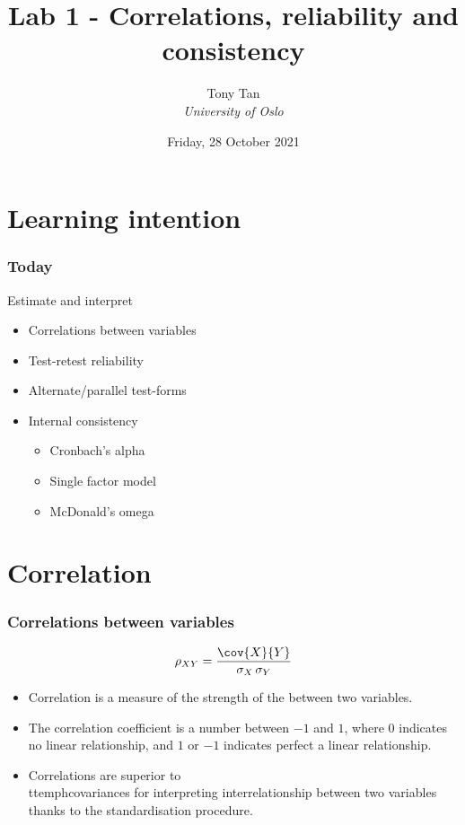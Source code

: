 \documentclass[compress]{beamer}\usepackage[]{graphicx}\usepackage[]{xcolor}
\title{Lab 1 - Correlations, reliability and consistency}
\author[]{Tony Tan \\\vspace{6pt} {\em{University of Oslo}} }
\date{Friday, 28 October 2021}
\begin{document}
\begin{frame}[fragile]
\titlepage
\end{frame}


\section{Learning intention}

\begin{frame}[fragile]
  \frametitle{Today}
  Estimate and interpret
    \begin{itemize}
      \item Correlations between variables
      \item Test-retest reliability
      \item Alternate/parallel test-forms
      \item Internal consistency
        \begin{itemize}
          \item Cronbach's alpha
          \item Single factor model
          \item McDonald's omega
        \end{itemize}
    \end{itemize}
\end{frame}


\section{Correlation}

\begin{frame}[fragile]
  \frametitle{Correlations between variables}

      \[ \rho_{XY} = \frac{\cov{X}{Y}}{\sigma_X \, \sigma_Y} \]

    \begin{itemize}
      \item Correlation is a measure of the strength of the  between two variables.
      \item The correlation coefficient is a number between $-1$ and $1$, where $0$ indicates no linear relationship, and $1$ or $-1$ indicates perfect a linear relationship.
      \item Correlations are superior to \\ttemph{covariances} for interpreting interrelationship between two variables thanks to the standardisation procedure.
    \end{itemize}
\end{frame}
\end{document}
